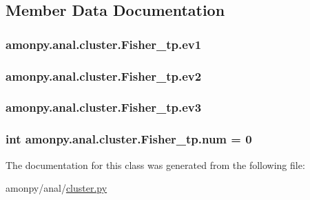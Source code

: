 \subsection{Member Data Documentation}
\hypertarget{classamonpy_1_1anal_1_1cluster_1_1_fisher__tp_a4b282e58dde2fdfc1c815e6f6d2fba5f}{
\subsubsection[{ev1}]{\setlength{\rightskip}{0pt plus 5cm}amonpy.\-anal.\-cluster.\-Fisher\-\_\-tp.\-ev1}}\label{classamonpy_1_1anal_1_1cluster_1_1_fisher__tp_a4b282e58dde2fdfc1c815e6f6d2fba5f}
\hypertarget{classamonpy_1_1anal_1_1cluster_1_1_fisher__tp_a5aad4ba062a0103b45387fea062e00f9}{
\subsubsection[{ev2}]{\setlength{\rightskip}{0pt plus 5cm}amonpy.\-anal.\-cluster.\-Fisher\-\_\-tp.\-ev2}}\label{classamonpy_1_1anal_1_1cluster_1_1_fisher__tp_a5aad4ba062a0103b45387fea062e00f9}
\hypertarget{classamonpy_1_1anal_1_1cluster_1_1_fisher__tp_a222ee1411c4db3f384af8421292f2ec1}{
\subsubsection[{ev3}]{\setlength{\rightskip}{0pt plus 5cm}amonpy.\-anal.\-cluster.\-Fisher\-\_\-tp.\-ev3}}\label{classamonpy_1_1anal_1_1cluster_1_1_fisher__tp_a222ee1411c4db3f384af8421292f2ec1}
\hypertarget{classamonpy_1_1anal_1_1cluster_1_1_fisher__tp_a3eff8425c58f4b61a8bff758141bfc3e}{
\subsubsection[{num}]{\setlength{\rightskip}{0pt plus 5cm}int amonpy.\-anal.\-cluster.\-Fisher\-\_\-tp.\-num = 0\hspace{0.3cm}{\ttfamily [static]}}}\label{classamonpy_1_1anal_1_1cluster_1_1_fisher__tp_a3eff8425c58f4b61a8bff758141bfc3e}


The documentation for this class was generated from the following file\-:\begin{DoxyCompactItemize}
\item 
amonpy/anal/\hyperlink{cluster_8py}{cluster.\-py}\end{DoxyCompactItemize}
